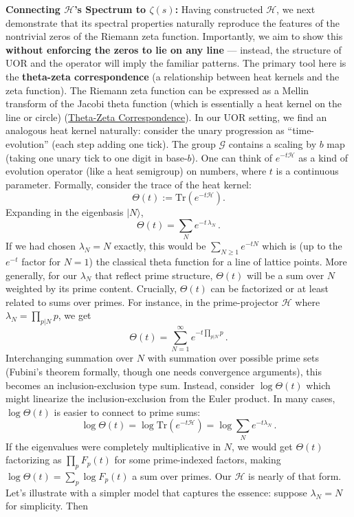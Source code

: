 \documentclass{article}
\begin{document}
\textbf{Connecting $\mathcal{H}$’s Spectrum to $\zeta(s)$:} Having constructed $\mathcal{H}$, we next demonstrate that its spectral properties naturally reproduce the features of the nontrivial zeros of the Riemann zeta function. Importantly, we aim to show this \textbf{without enforcing the zeros to lie on any line} --- instead, the structure of UOR and the operator will imply the familiar patterns. The primary tool here is the \textbf{theta-zeta correspondence} (a relationship between heat kernels and the zeta function). The Riemann zeta function can be expressed as a Mellin transform of the Jacobi theta function (which is essentially a heat kernel on the line or circle) (\href{https://www.math.columbia.edu/~woit/fourier-analysis/theta-zeta.pdf#:~:text=4,equation%20for%20the%20zeta%20function}{Theta-Zeta Correspondence}). In our UOR setting, we find an analogous heat kernel naturally: consider the unary progression as ``time-evolution'' (each step adding one tick). The group $\mathcal{G}$ contains a scaling by $b$ map (taking one unary tick to one digit in base-$b$). One can think of $e^{-t\mathcal{H}}$ as a kind of evolution operator (like a heat semigroup) on numbers, where $t$ is a continuous parameter. Formally, consider the trace of the heat kernel:
$$
\Theta(t) := \mathrm{Tr}(e^{-t \mathcal{H}}).
$$
Expanding in the eigenbasis $|N\rangle$, 
$$
\Theta(t) = \sum_N e^{-t\,\lambda_N}\,.
$$
If we had chosen $\lambda_N = N$ exactly, this would be $\sum_{N\ge1} e^{-tN}$ which is (up to the $e^{-t}$ factor for $N=1$) the classical theta function for a line of lattice points. More generally, for our $\lambda_N$ that reflect prime structure, $\Theta(t)$ will be a sum over $N$ weighted by its prime content. Crucially, $\Theta(t)$ can be factorized or at least related to sums over primes. For instance, in the prime-projector $\mathcal{H}$ where $\lambda_N=\prod_{p|N}p$, we get 
$$
\Theta(t) = \sum_{N=1}^\infty e^{-t \prod_{p|N}p}\,.
$$
Interchanging summation over $N$ with summation over possible prime sets (Fubini’s theorem formally, though one needs convergence arguments), this becomes an inclusion-exclusion type sum. Instead, consider $\log \Theta(t)$ which might linearize the inclusion-exclusion from the Euler product. In many cases, $\log \Theta(t)$ is easier to connect to prime sums:
$$
\log \Theta(t) = \log \mathrm{Tr}(e^{-t\mathcal{H}}) = \log\sum_N e^{-t \lambda_N}\,.
$$
If the eigenvalues were completely multiplicative in $N$, we would get $\Theta(t)$ factorizing as $\prod_p F_p(t)$ for some prime-indexed factors, making $\log \Theta(t) = \sum_p \log F_p(t)$ a sum over primes. Our $\mathcal{H}$ is nearly of that form. Let’s illustrate with a simpler model that captures the essence: suppose $\lambda_N = N$ for simplicity. Then 
\end{document}
